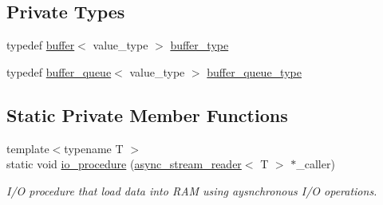 \subsection*{Private Types}
\begin{DoxyCompactItemize}
\item 
typedef \hyperlink{structbuffer}{buffer}$<$ value\+\_\+type $>$ \hyperlink{classasync__stream__reader_a48e2b7d24cfceba922a771e9c314b40c}{buffer\+\_\+type}
\item 
typedef \hyperlink{structbuffer__queue}{buffer\+\_\+queue}$<$ value\+\_\+type $>$ \hyperlink{classasync__stream__reader_a5301e887b098a0ade898265ca6935d68}{buffer\+\_\+queue\+\_\+type}
\end{DoxyCompactItemize}
\subsection*{Static Private Member Functions}
\begin{DoxyCompactItemize}
\item 
{\footnotesize template$<$typename T $>$ }\\static void \hyperlink{classasync__stream__reader_aee14e37431d75f5a80831ce6c3632ea2}{io\+\_\+procedure} (\hyperlink{classasync__stream__reader}{async\+\_\+stream\+\_\+reader}$<$ T $>$ $\ast$\+\_\+caller)
\begin{DoxyCompactList}\small\item\em I/O procedure that load data into R\+AM using aysnchronous I/O operations. \end{DoxyCompactList}\end{DoxyCompactItemize}

